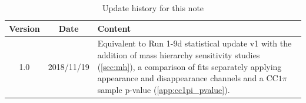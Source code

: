 \documentclass[11pt]{elsarticle}
\begin{document}





\newpage

\begin{table}[h]
	\centering
	\begin{tabularx}{\linewidth}{ c c X }
 	\hline
	Version	& Date	& Content \\
	\hline
	1.0 & 2018/11/19 & Equivalent to Run 1-9d statistical update v1 with the addition of mass hierarchy sensitivity studies (\cref{sec:mh}), a comparison of \disappearance fits separately applying appearance and disappearance channels and a CC$1\pi$ sample p-value (\cref{app:cc1pi_pvalue}). \\
	\hline
	\end{tabularx}
\caption{Update history for this note}
\label{tab:update_history}
\end{table}

\newpage

\tableofcontents

\newpage












\clearpage
\begin{appendices}
	
	
	
	
	
	
	
	
	
	
	
\end{appendices}

\clearpage
\end{document}
